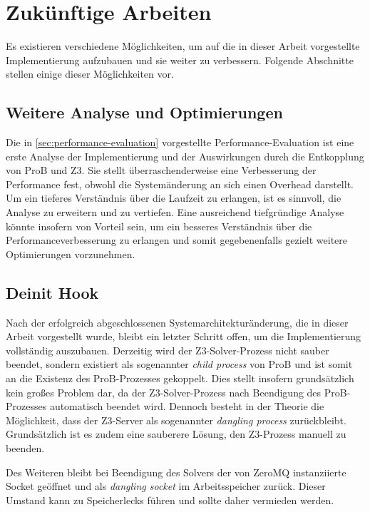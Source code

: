 

\section{Zukünftige Arbeiten}

Es existieren verschiedene Möglichkeiten, um auf die in dieser Arbeit vorgestellte Implementierung aufzubauen und sie weiter zu verbessern.
Folgende Abschnitte stellen einige dieser Möglichkeiten vor.

\subsection{Weitere Analyse und Optimierungen}

Die in \cref{sec:performance-evaluation} vorgestellte Performance-Evaluation ist eine erste Analyse der Implementierung und der Auswirkungen durch die Entkopplung von ProB und Z3.
Sie stellt überraschenderweise eine Verbesserung der Performance fest, obwohl die Systemänderung an sich einen Overhead darstellt.
Um ein tieferes Verständnis über die Laufzeit zu erlangen, ist es sinnvoll, die Analyse zu erweitern und zu vertiefen.
Eine ausreichend tiefgründige Analyse könnte insofern von Vorteil sein, um ein besseres Verständnis über die Performanceverbesserung zu erlangen und somit gegebenenfalls gezielt weitere Optimierungen vorzunehmen.

\subsection{Deinit Hook}

Nach der erfolgreich abgeschlossenen Systemarchitekturänderung, die in dieser Arbeit vorgestellt wurde,
bleibt ein letzter Schritt offen, um die Implementierung vollständig auszubauen.
Derzeitig wird der Z3-Solver-Prozess nicht sauber beendet, sondern existiert als sogenannter \textit{child process} von ProB und ist somit an die Existenz des ProB-Prozesses gekoppelt.
Dies stellt insofern grundsätzlich kein großes Problem dar, da der Z3-Solver-Prozess nach Beendigung des ProB-Prozesses automatisch beendet wird.
Dennoch besteht in der Theorie die Möglichkeit, dass der Z3-Server als sogenannter \textit{dangling process} zurückbleibt.
Grundsätzlich ist es zudem eine sauberere Lösung, den Z3-Prozess manuell zu beenden.

Des Weiteren bleibt bei Beendigung des Solvers der von ZeroMQ instanziierte Socket geöffnet und als \textit{dangling socket} im Arbeitsspeicher zurück.
Dieser Umstand kann zu Speicherlecks führen und sollte daher vermieden werden.

